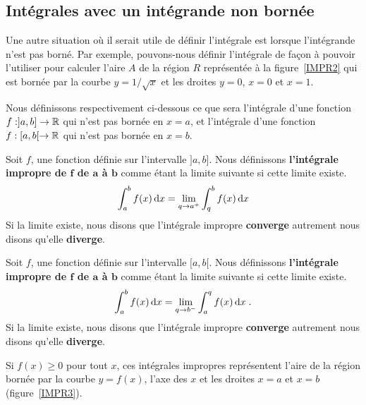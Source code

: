 {\subsection{Intégrales avec un intégrande non bornée}

Une autre situation où il serait utile de définir l'intégrale est
lorsque l'intégrande n'est pas borné.  Par exemple, pouvons-nous définir
l'intégrale de façon à pouvoir l'utiliser pour calculer l'aire $A$ de
la région $R$ représentée à la figure~\ref{IMPR2} qui est bornée par la courbe
$y=1/\sqrt{x}$ et les droites $y=0$, $x=0$ et $x=1$.


Nous définissons respectivement ci-dessous ce que sera l'intégrale d'une
fonction $f:]a,b]\to \mathbb{R}$ qui n'est pas bornée en $x=a$, et
l'intégrale d'une fonction $f:[a,b[\to \mathbb{R}$ qui n'est pas bornée en
$x=b$.

\begin{defn} 
Soit $f$, une fonction définie sur l'intervalle $]a, b]$. Nous définissons
{\bfseries l'intégrale impropre de $\mathbf f$ de $\mathbf a$ à
$\mathbf b$} comme étant la limite suivante si cette limite existe.
\[
\int_a^b f(x) \,\mathrm{d}x
= \lim_{q\rightarrow a^+} \int_q^b f(x)\,\mathrm{d}x
\]
Si la limite existe, nous disons que l'intégrale impropre
{\bfseries converge} autrement nous disons qu'elle {\bfseries diverge}.

Soit $f$, une fonction définie sur l'intervalle $[a, b[$.  Nous définissons
{\bfseries l'intégrale impropre de $\mathbf f$ de $\mathbf a$ à
$\mathbf b$} comme étant la limite suivante si cette limite existe.
\[
\int_a^b f(x) \,\mathrm{d}x
= \lim_{q\rightarrow b^-} \int_a^q f(x)\,\mathrm{d}x \; .
\]
Si la limite existe, nous disons que l'intégrale impropre
{\bfseries converge} autrement nous disons qu'elle {\bfseries diverge}.
\end{defn}

Si $f(x)\geq 0$ pour tout $x$, ces intégrales impropres représentent
l'aire de la région bornée par la courbe $y=f(x)$, l'axe des $x$ et
les droites $x=a$ et $x=b$ (figure~\ref{IMPR3}).


}
